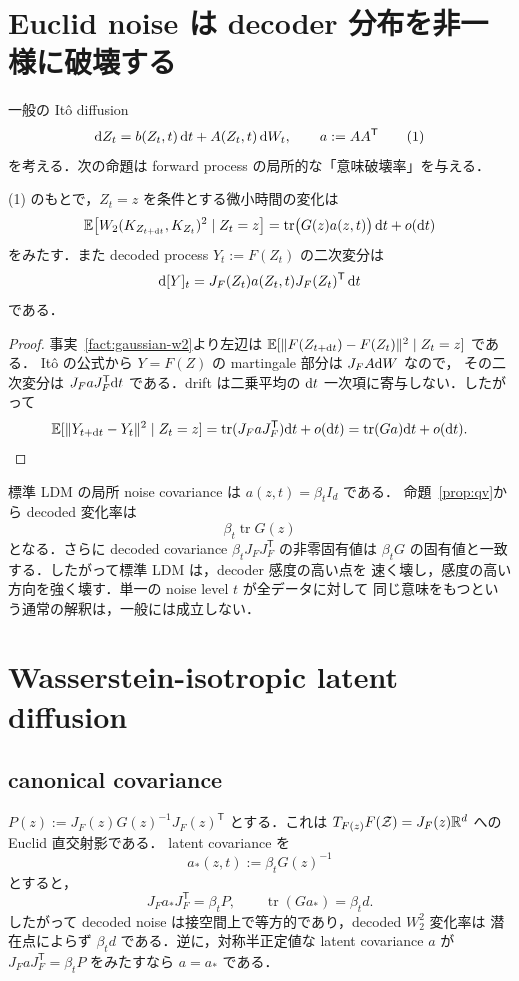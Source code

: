 \documentclass[uplatex,dvipdfmx,11pt,a4paper]{jsarticle}
\begin{document}
\section{Euclid noise は decoder 分布を非一様に破壊する}
\label{sec:mismatch}

一般の It\^o diffusion
\[
  \mathrm{d} Z_t=b(Z_t,t)\,\mathrm{d} t+A(Z_t,t)\,\mathrm{d} W_t,
  \qquad a:=AA^{\mathsf T}
  \tag{1}
\]
を考える．次の命題は forward process の局所的な「意味破壊率」を与える．

\begin{proposition}
\label{prop:qv}
  (1) のもとで，$Z_t=z$ を条件とする微小時間の変化は
  \[
    \mathbb{E}\!\left[
      W_2(K_{Z_{t+\mathrm{d} t}},K_{Z_t})^2\mid Z_t=z
    \right]
    =\operatorname{tr}\bigl(G(z)a(z,t)\bigr)\,\mathrm{d} t+o(\mathrm{d} t)
  \]
  をみたす．また decoded process $Y_t:=F(Z_t)$ の二次変分は
  \[
    \mathrm{d}[Y]_t=J_F(Z_t)a(Z_t,t)J_F(Z_t)^{\mathsf T}\,\mathrm{d} t
  \]
  である．
\end{proposition}

\begin{proof}
  事実~\ref{fact:gaussian-w2}より左辺は
  $\mathbb{E}[\lVert F(Z_{t+\mathrm{d} t})-F(Z_t) \rVert^2\mid Z_t=z]$ である．
  It\^o の公式から $Y=F(Z)$ の martingale 部分は $J_FA\mathrm{d} W$ なので，
  その二次変分は $J_FaJ_F^{\mathsf T}\mathrm{d} t$ である．drift は二乗平均の
  $\mathrm{d} t$ 一次項に寄与しない．したがって
  \[
    \mathbb{E}[\lVert Y_{t+\mathrm{d} t}-Y_t \rVert^2\mid Z_t=z]
    =\operatorname{tr}(J_FaJ_F^{\mathsf T})\mathrm{d} t+o(\mathrm{d} t)
    =\operatorname{tr}(Ga)\mathrm{d} t+o(\mathrm{d} t).
  \]
\end{proof}

標準 LDM の局所 noise covariance は $a(z,t)=\beta_tI_d$ である．
命題~\ref{prop:qv}から decoded 変化率は
\[
  \boxed{\ \beta_t\operatorname{tr}G(z)\ }
\]
となる．さらに decoded covariance $\beta_tJ_FJ_F^{\mathsf T}$ の非零固有値は
$\beta_tG$ の固有値と一致する．したがって標準 LDM は，decoder 感度の高い点を
速く壊し，感度の高い方向を強く壊す．単一の noise level $t$ が全データに対して
同じ意味をもつという通常の解釈は，一般には成立しない．

\section{Wasserstein-isotropic latent diffusion}
\label{sec:canonical}

\subsection{canonical covariance}

\begin{theorem}
\label{thm:canonical}
  $P(z):=J_F(z)G(z)^{-1}J_F(z)^{\mathsf T}$ とする．これは
  $T_{F(z)}F(\mathcal{Z})=J_F(z)\mathbb{R}^d$ への Euclid 直交射影である．
  latent covariance を
  \[
    \boxed{\ a_*(z,t):=\beta_tG(z)^{-1}\ }
    \tag{2}
  \]
  とすると，
  \[
    J_Fa_*J_F^{\mathsf T}=\beta_tP,
    \qquad
    \operatorname{tr}(Ga_*)=\beta_td.
  \]
  したがって decoded noise は接空間上で等方的であり，decoded $W_2^2$ 変化率は
  潜在点によらず $\beta_td$ である．逆に，対称半正定値な latent covariance
  $a$ が $J_FaJ_F^{\mathsf T}=\beta_tP$ をみたすなら $a=a_*$ である．
\end{theorem}
\end{document}
